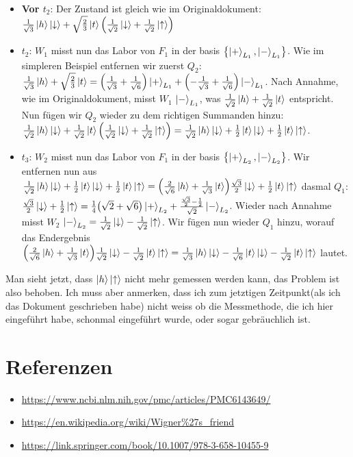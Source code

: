\documentclass[a4paper]{article}
\begin{document}
\begin{itemize}
	\item \textbf{Vor $t_2$}: Der Zustand ist gleich wie im Originaldokument: $\frac{1}{\sqrt{3}}\ket{h}\ket{\downarrow} + \sqrt{\frac{2}{3}}\ket{t}\qty(\frac{1}{\sqrt{2}} \ket{\downarrow} + \frac{1}{\sqrt{2}} \ket{\uparrow})$
	\item \textbf{$t_2$}: $W_1$ misst nun das Labor von $F_1$ in der basis $\qty{\ket{+}_{L_1}, \ket{-}_{L_1}}$. Wie im simpleren Beispiel entfernen wir zuerst $Q_2$: $\frac{1}{\sqrt{3}}\ket{h} + \sqrt{\frac{2}{3}}\ket{t} = \qty(\frac{1}{\sqrt{3}} + \frac{1}{\sqrt{6}})\ket{+}_{L_1} + \qty(-\frac{1}{\sqrt{3}} + \frac{1}{\sqrt{6}})\ket{-}_{L_1}$. Nach Annahme, wie im Originaldokument, misst $W_1$ $\ket{-}_{L_1}$, was $\frac{1}{\sqrt{2}} \ket{h} + \frac{1}{\sqrt{2}} \ket{t}$ entspricht. Nun fügen wir $Q_2$ wieder zu dem richtigen Summanden hinzu: $\frac{1}{\sqrt{2}} \ket{h}\ket{\downarrow} + \frac{1}{\sqrt{2}} \ket{t}\qty(\frac{1}{\sqrt{2}} \ket{\downarrow} + \frac{1}{\sqrt{2}} \ket{\uparrow}) = \frac{1}{\sqrt{2}} \ket{h}\ket{\downarrow} + \frac{1}{2} \ket{t}\ket{\downarrow} + \frac{1}{2} \ket{t}\ket{\uparrow}$.
	\item \textbf{$t_3$}: $W_2$ misst nun das Labor von $F_1$ in der basis $\qty{\ket{+}_{L_2}, \ket{-}_{L_2}}$. Wir entfernen nun aus $\frac{1}{\sqrt{2}} \ket{h}\ket{\downarrow} + \frac{1}{2} \ket{t}\ket{\downarrow} + \frac{1}{2} \ket{t}\ket{\uparrow} = \qty(\frac{2}{\sqrt{6}} \ket{h} + \frac{1}{\sqrt{3}} \ket{t})\frac{\sqrt{3}}{2}\ket{\downarrow} + \frac{1}{2} \ket{t}\ket{\uparrow}$ dasmal $Q_1$: $\frac{\sqrt{3}}{2}\ket{\downarrow} +  \frac{1}{2} \ket{\uparrow} = \frac{1}{4}\qty(\sqrt{2} + \sqrt{6})\ket{+}_{L_2} + \frac{ \frac{\sqrt{3}}{2} - \frac{1}{2} }{\sqrt{2}}\ket{-}_{L_2}$. Wieder nach Annahme misst $W_2$ $\ket{-}_{L_2} = \frac{1}{\sqrt{2}} \ket{\downarrow} - \frac{1}{\sqrt{2}} \ket{\uparrow}$. Wir fügen nun wieder $Q_1$ hinzu, worauf das Endergebnis $\qty(\frac{2}{\sqrt{6}} \ket{h} + \frac{1}{\sqrt{3}} \ket{t})\frac{1}{\sqrt{2}}\ket{\downarrow} - \frac{1}{\sqrt{2}}\ket{t}\ket{\uparrow} = \frac{1}{\sqrt{3}} \ket{h}\ket{\downarrow} - \frac{1}{\sqrt{6}}\ket{t}\ket{\downarrow} - \frac{1}{\sqrt{2}}\ket{t}\ket{\uparrow}$ lautet.
\end{itemize}
Man sieht jetzt, dass $\ket{h}\ket{\uparrow}$ nicht mehr gemessen werden kann, das Problem ist also behoben. Ich muss aber anmerken, dass ich zum jetztigen Zeitpunkt(als ich das Dokument geschrieben habe) nicht weiss ob die Messmethode, die ich hier eingeführt habe, schonmal eingeführt wurde, oder sogar gebräuchlich ist.

\section*{Referenzen}
\begin{itemize}
	\item \url{https://www.ncbi.nlm.nih.gov/pmc/articles/PMC6143649/}
	\item \url{https://en.wikipedia.org/wiki/Wigner%27s_friend}
	\item \url{https://link.springer.com/book/10.1007/978-3-658-10455-9}
\end{itemize}
\end{document}
